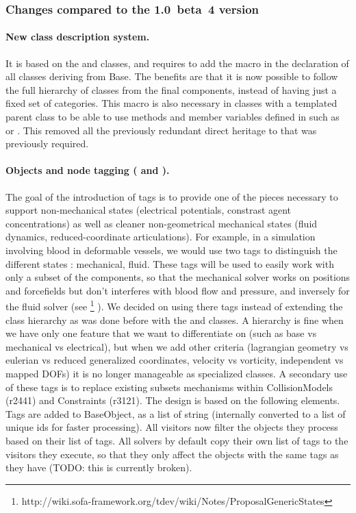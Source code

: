 \subsubsection{Changes compared to the 1.0~beta~4 version}\label{sec:design-core-objectmodel-changes}

\paragraph{New class description system.}
It is based on the  and  classes, and requires to add the  macro in the declaration of all classes deriving from Base.
The benefits are that it is now possible to follow the full hierarchy of classes from the final components, instead of having just a fixed set of categories.
This macro is also necessary in classes with a templated parent class to be able to use methods and member variables defined in  such as  or . This removed all the previously redundant direct heritage to  that was previously required.

\paragraph{Objects and node tagging ( and ).}
The goal of the introduction of tags is to provide one of the pieces necessary to support non-mechanical states (electrical potentials, constrast agent concentrations) as well as cleaner non-geometrical mechanical states (fluid dynamics, reduced-coordinate articulations).
For example, in a simulation involving blood in deformable vessels, we would use two tags to distinguish the different states : mechanical, fluid.
These tags will be used to easily work with only a subset of the components, so that the mechanical solver works on positions and forcefields but don't interferes with blood flow and pressure, and inversely for the fluid solver (see \footnote{http://wiki.sofa-framework.org/tdev/wiki/Notes/ProposalGenericStates} ).
We decided on using there tags instead of extending the class hierarchy as was done before with the  and  classes.
A hierarchy is fine when we have only one feature that we want to differentiate on (such as base vs mechanical vs electrical), but when we add other criteria (lagrangian geometry vs eulerian vs reduced generalized coordinates, velocity vs vorticity, independent vs mapped DOFs) it is no longer manageable as specialized classes.
A secondary use of these tags is to replace existing subsets mechanisms within CollisionModels (r2441) and Constraints (r3121).
The design is based on the following elements.
Tags are added to BaseObject, as a list of string (internally converted to a list of unique ids for faster processing).
All visitors now filter the objects they process based on their list of tags.
All solvers by default copy their own list of tags to the visitors they execute, so that they only affect the objects with the same tags as they have (TODO: this is currently broken). 


